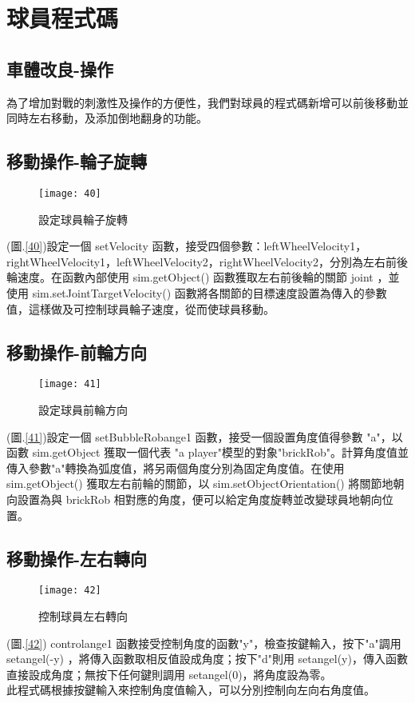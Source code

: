 \chapter{球員程式碼}
\renewcommand{\baselinestretch}{10.0} %
\setcounter{page}{4}  %
\fontsize{14pt}{2.5pt}\sectionef
\section{車體改良-操作}
  為了增加對戰的刺激性及操作的方便性，我們對球員的程式碼新增可以前後移動並同時左右移動，及添加倒地翻身的功能。\\[1pt]

\section{移動操作-輪子旋轉}
\begin{figure}[hbt!]
\begin{center}
\texttt{[image: 40]}
\caption{\Large 設定球員輪子旋轉}\label{fig.40}
\end{center}
\end{figure}
(圖.\ref{40})設定一個 setVelocity 函數，接受四個參數：leftWheelVelocity1，rightWheelVelocity1，leftWheelVelocity2，rightWheelVelocity2，分別為左右前後輪速度。在函數內部使用 sim.getObject() 函數獲取左右前後輪的關節 joint ，並使用 sim.setJointTargetVelocity() 函數將各關節的目標速度設置為傳入的參數值，這樣做及可控制球員輪子速度，從而使球員移動。\\
\newpage
\section{移動操作-前輪方向}
\begin{figure}[hbt!]
\begin{center}
\texttt{[image: 41]}
\caption{\Large 設定球員前輪方向}\label{fig.41}
\end{center}
\end{figure}
(圖.\ref{41})設定一個 setBubbleRobange1 函數，接受一個設置角度值得參數 "a"，以函數 sim.getObject 獲取一個代表 "a player"模型的對象"brickRob"。計算角度值並傳入參數"a"轉換為弧度值，將另兩個角度分別為固定角度值。在使用 sim.getObject() 獲取左右前輪的關節，以 sim.setObjectOrientation() 將關節地朝向設置為與 brickRob 相對應的角度，便可以給定角度旋轉並改變球員地朝向位置。\\
\section{移動操作-左右轉向}
\begin{figure}[hbt!]
\begin{center}
\texttt{[image: 42]}
\caption{\Large 控制球員左右轉向}\label{fig.42}
\end{center}
\end{figure}
(圖.\ref{42}) controlange1 函數接受控制角度的函數"y"，檢查按鍵輸入，按下"a"調用 setangel(-y) ，將傳入函數取相反值設成角度；按下"d"則用 setangel(y)，傳入函數直接設成角度；無按下任何鍵則調用 setangel(0)，將角度設為零。\\
\newpage
  此程式碼根據按鍵輸入來控制角度值輸入，可以分別控制向左向右角度值。\\
